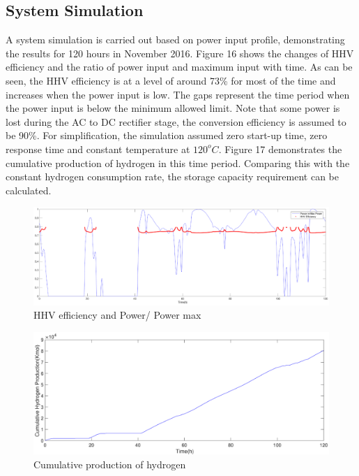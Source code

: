 \subsection{System Simulation}
A system simulation is carried out based on power input profile,  demonstrating the results for 120 hours in November 2016.  Figure 16  shows the changes of  HHV efficiency and the ratio of power input and maximum input with time. As can be seen, the HHV efficiency is at a level of around 73\% for most of the time and increases when the power input is low. The gaps represent the time period when the power input is below the minimum allowed limit. Note that some power is lost during the AC to DC rectifier stage, the conversion efficiency is assumed to be 90\%. For simplification, the simulation assumed zero start-up time, zero response time and constant temperature at $120^oC$. Figure 17 demonstrates the cumulative production of hydrogen in this time period. Comparing this with the constant hydrogen consumption rate, the storage capacity requirement can be calculated. 
\begin{figure}[htb]
\centering
\includegraphics[width = 18cm]{simulation.eps}
\caption{HHV efficiency and Power/ Power max}
\end{figure}

\begin{figure}[htb]
\centering
\includegraphics[width = 17cm]{cumulative.eps}
\caption{Cumulative production of hydrogen }
\end{figure}




